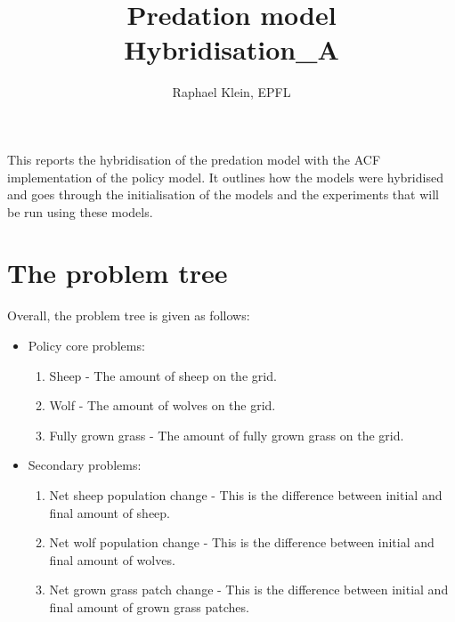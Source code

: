\documentclass[12pt]{article}
\title{Predation model \\ Hybridisation\_A}
\author{Raphael Klein, EPFL}
\begin{document}
\maketitle


This reports the hybridisation of the predation model with the ACF implementation of the policy model. It outlines how the models were hybridised and goes through the initialisation of the models and the experiments that will be run using these models.

\tableofcontents

\section{The problem tree}
\label{sec:interfaceProblemTree}

Overall, the problem tree is given as follows:

\begin{itemize}
\item Policy core problems:
	\begin{enumerate}
	
	\item Sheep - 
	The amount of sheep on the grid.
	
	\item Wolf - 
	The amount of wolves on the grid.
	
	\item Fully grown grass - 
	The amount of fully grown grass on the grid.
	
	\end{enumerate}
	
\item Secondary problems:
	\begin{enumerate}

	\item Net sheep population change - 
	This is the difference between initial and final amount of sheep.
	
	\item Net wolf population change - 
	This is the difference between initial and final amount of wolves.
	
	\item Net grown grass patch change - 
	This is the difference between initial and final amount of grown grass patches.
	
	\end{enumerate}
	
\end{itemize}
\end{document}
